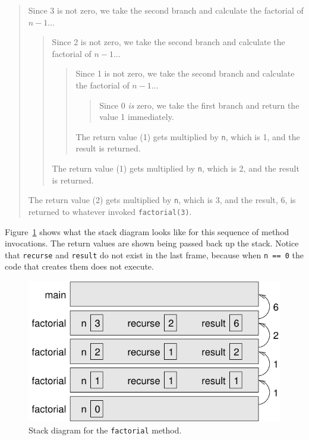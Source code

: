 \documentclass[12pt]{book}
\theoremstyle{exercise}
\newcommand{\java}[1]{\verb"#1"}
\newcommand{\java}[1]{\lstinline{#1}} %
\begin{document}
\vspace{-1ex}
\begin{quote}
Since 3 is not zero, we take the second branch and calculate the factorial of $n-1$...
\begin{quote}
Since 2 is not zero, we take the second branch and calculate the factorial of $n-1$...
\begin{quote}
Since 1 is not zero, we take the second branch and calculate the factorial of $n-1$...
\begin{quote}
Since 0 {\em is} zero, we take the first branch and return the value 1 immediately.
\end{quote}
The return value (1) gets multiplied by \java{n}, which is 1, and the result is returned.
\end{quote}
The return value (1) gets multiplied by \java{n}, which is 2, and the result is returned.
\end{quote}
The return value (2) gets multiplied by \java{n}, which is 3, and the result, 6, is returned to whatever invoked \java{factorial(3)}.
\end{quote}
\vspace{-1ex}


Figure~\ref{fig:stack3} shows what the stack diagram looks like for this sequence of method invocations.
The return values are shown being passed back up the stack.
Notice that \java{recurse} and \java{result} do not exist in the last frame, because when \java{n == 0} the code that creates them does not execute.

\begin{figure}[!h]
\begin{center}
\includegraphics{figs/stack3.pdf}
\caption{Stack diagram for the \java{factorial} method.}
\label{fig:stack3}
\end{center}
\end{figure}
\end{document}
